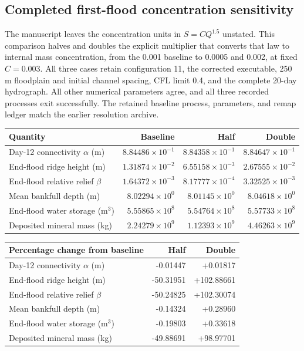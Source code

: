 \subsection{Completed first-flood concentration sensitivity}
The manuscript leaves the concentration units in $S=CQ^{1.5}$ unstated.
This comparison halves and doubles the explicit multiplier that converts
that law to internal mass concentration, from the 0.001 baseline to
0.0005 and 0.002, at fixed $C=0.003$. All three cases retain
configuration 11, the corrected executable, 250 m
floodplain and initial channel spacing, CFL limit 0.4, and the complete
20-day hydrograph. All other numerical parameters agree, and all three
recorded processes exit successfully. The retained baseline process,
parameters, and remap ledger match the earlier resolution archive.

\begin{center}\small\setlength{\tabcolsep}{4pt}
\begin{tabular}{lrrr}
\toprule
Quantity & Baseline & Half & Double \\
\midrule
Day-12 connectivity $\alpha$ (m) & $8.84486\times10^{-1}$ & $8.84358\times10^{-1}$ & $8.84647\times10^{-1}$ \\
End-flood ridge height (m) & $1.31874\times10^{-2}$ & $6.55158\times10^{-3}$ & $2.67555\times10^{-2}$ \\
End-flood relative relief $\beta$ & $1.64372\times10^{-3}$ & $8.17777\times10^{-4}$ & $3.32525\times10^{-3}$ \\
Mean bankfull depth (m) & $8.02294\times10^{0}$ & $8.01145\times10^{0}$ & $8.04618\times10^{0}$ \\
End-flood water storage (m$^3$) & $5.55865\times10^{8}$ & $5.54764\times10^{8}$ & $5.57733\times10^{8}$ \\
Deposited mineral mass (kg) & $2.24279\times10^{9}$ & $1.12393\times10^{9}$ & $4.46263\times10^{9}$ \\
\bottomrule\end{tabular}\end{center}
\begin{center}\small
\begin{tabular}{lrr}
\toprule
Percentage change from baseline & Half & Double \\
\midrule
Day-12 connectivity $\alpha$ (m) & -0.01447 & +0.01817 \\
End-flood ridge height (m) & -50.31951 & +102.88661 \\
End-flood relative relief $\beta$ & -50.24825 & +102.30074 \\
Mean bankfull depth (m) & -0.14324 & +0.28960 \\
End-flood water storage (m$^3$) & -0.19803 & +0.33618 \\
Deposited mineral mass (kg) & -49.88691 & +98.97701 \\
\bottomrule\end{tabular}\end{center}
